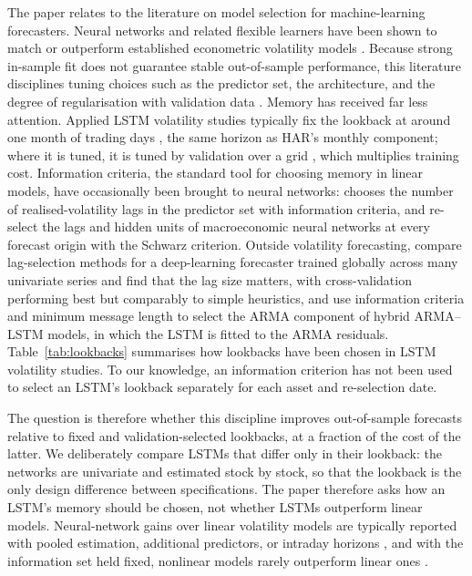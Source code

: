 \documentclass[12pt]{article}
\begin{document}
The paper relates to the literature on model selection for machine-learning forecasters. Neural networks and related flexible learners have been shown to match or outperform established econometric volatility models \parencite{bucci-2020,christensen-2022,morenopino-2024}. Because strong in-sample fit does not guarantee stable out-of-sample performance, this literature disciplines tuning choices such as the predictor set, the architecture, and the degree of regularisation with validation data \parencite{gu-2020,chen-2023}. Memory has received far less attention. Applied LSTM volatility studies typically fix the lookback at around one month of trading days \parencite{zhang-2023,rosenbaum-2022}, the same horizon as HAR's monthly component; where it is tuned, it is tuned by validation over a grid \parencite{rodikov-2022}, which multiplies training cost. Information criteria, the standard tool for choosing memory in linear models, have occasionally been brought to neural networks: \textcite{bucci-2020} chooses the number of realised-volatility lags in the predictor set with information criteria, and \textcite{swanson-1997} re-select the lags and hidden units of macroeconomic neural networks at every forecast origin with the Schwarz criterion. Outside volatility forecasting, \textcite{leites-2024} compare lag-selection methods for a deep-learning forecaster trained globally across many univariate series and find that the lag size matters, with cross-validation performing best but comparably to simple heuristics, and \textcite{fang-2021} use information criteria and minimum message length to select the ARMA component of hybrid ARMA--LSTM models, in which the LSTM is fitted to the ARMA residuals. Table~\ref{tab:lookbacks} summarises how lookbacks have been chosen in LSTM volatility studies. To our knowledge, an information criterion has not been used to select an LSTM's lookback separately for each asset and re-selection date.



The question is therefore whether this discipline improves out-of-sample forecasts relative to fixed and validation-selected lookbacks, at a fraction of the cost of the latter. We deliberately compare LSTMs that differ only in their lookback: the networks are univariate and estimated stock by stock, so that the lookback is the only design difference between specifications. The paper therefore asks how an LSTM's memory should be chosen, not whether LSTMs outperform linear models. Neural-network gains over linear volatility models are typically reported with pooled estimation, additional predictors, or intraday horizons \parencite{christensen-2022,zhang-2023,rosenbaum-2022}, and with the information set held fixed, nonlinear models rarely outperform linear ones \parencite{branco-2024}.
\end{document}

